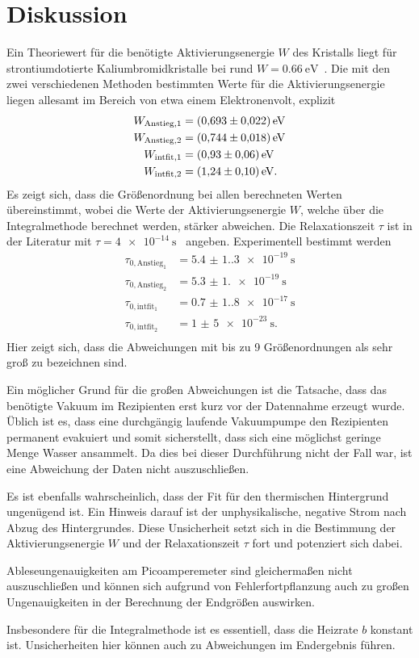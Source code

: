 \section{Diskussion}
\label{sec:Diskussion}
Ein Theoriewert für die benötigte Aktivierungsenergie $W$ des Kristalls liegt für strontiumdotierte Kaliumbromidkristalle bei rund $W=\qty{0.66}{\electronvolt}$~\cite{v48_litwert_W}. Die mit 
den zwei verschiedenen Methoden bestimmten Werte für die Aktivierungsenergie liegen allesamt im Bereich von etwa einem Elektronenvolt, explizit
\begin{align*}
    W_{\text{Anstieg}, 1} &= \qty{0.693+-0.022}{\electronvolt} \\
    W_{\text{Anstieg}, 2} &= \qty{0.744+-0.018}{\electronvolt} \\
    W_{\text{intfit}, 1} &= \qty{0.93+-0.06}{\electronvolt} \\    
    W_{\text{intfit}, 2} &= \qty{1.24+-0.10}{\electronvolt}. \\
\end{align*}
Es zeigt sich, dass die Größenordnung bei allen berechneten Werten übereinstimmt, wobei die Werte der Aktivierungsenergie $W$, welche über die Integralmethode 
berechnet werden, stärker abweichen.
Die Relaxationszeit $\tau$ ist in der Literatur mit $\tau=\qty{4e-14}{\second}$~\cite{v48_litwert_W} angeben. Experimentell bestimmt werden 
\begin{align*}
    \tau_{0, \text{Anstieg}_1} &= \qty{5.4(1.3)e-19}{\second} \\
    \tau_{0, \text{Anstieg}_2} &= \qty{5.3(1.0)e-19}{\second} \\
    \tau_{0, \text{intfit}_1} &= \qty{0.7(1.8)e-17}{\second} \\
    \tau_{0, \text{intfit}_2} &= \qty{1(5)e-23}{\second}. \\
\end{align*}
Hier zeigt sich, dass die Abweichungen mit bis zu 9 Größenordnungen als sehr groß zu bezeichnen sind.

Ein möglicher Grund für die großen Abweichungen ist die Tatsache, dass das benötigte Vakuum im Rezipienten erst kurz vor der Datennahme erzeugt wurde. Üblich 
ist es, dass eine durchgängig laufende Vakuumpumpe den Rezipienten permanent evakuiert und somit sicherstellt, dass sich eine möglichst geringe Menge Wasser
ansammelt. Da dies bei dieser Durchführung nicht der Fall war, ist eine Abweichung der Daten nicht auszuschließen.

Es ist ebenfalls wahrscheinlich, dass der Fit für den thermischen Hintergrund ungenügend ist. Ein Hinweis darauf ist der unphysikalische, negative Strom nach
Abzug des Hintergrundes. Diese Unsicherheit setzt sich in die Bestimmung der Aktivierungsenergie $W$ und der Relaxationszeit $\tau$ fort und potenziert sich dabei.

Ableseungenauigkeiten am Picoamperemeter sind gleichermaßen nicht auszuschließen und können sich aufgrund von Fehlerfortpflanzung auch zu großen Ungenauigkeiten
in der Berechnung der Endgrößen auswirken.

Insbesondere für die Integralmethode ist es essentiell, dass die Heizrate $b$ konstant ist. Unsicherheiten hier können auch zu Abweichungen im Endergebnis führen.